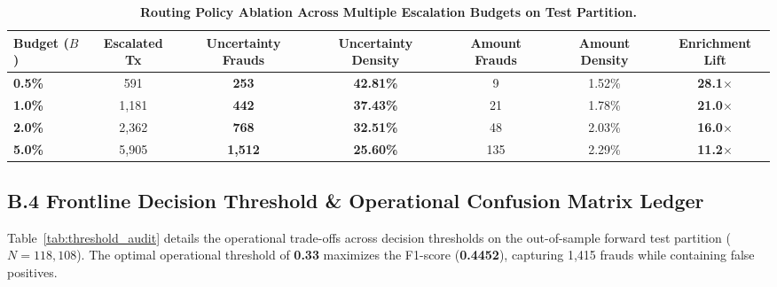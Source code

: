 \documentclass[10pt,a4paper]{article}
\begin{document}
\vspace{-2pt}
\begin{table}[h!]
\centering
\renewcommand{\arraystretch}{0.76}
\caption{\textbf{Routing Policy Ablation Across Multiple Escalation Budgets on Test Partition.}}
\label{tab:ablation}
\vspace{1pt}
\begin{tabularx}{\linewidth}{@{}lcccccc@{}}
\toprule
\textbf{Budget ($B$)} & \textbf{Escalated Tx} & \textbf{Uncertainty Frauds} & \textbf{Uncertainty Density} & \textbf{Amount Frauds} & \textbf{Amount Density} & \textbf{Enrichment Lift} \\
\midrule
\textbf{0.5\%} & 591 & \textbf{253} & \textbf{42.81\%} & 9 & 1.52\% & \textbf{28.1$\times$} \\
\textbf{1.0\%} & 1,181 & \textbf{442} & \textbf{37.43\%} & 21 & 1.78\% & \textbf{21.0$\times$} \\
\textbf{2.0\%} & 2,362 & \textbf{768} & \textbf{32.51\%} & 48 & 2.03\% & \textbf{16.0$\times$} \\
\textbf{5.0\%} & 5,905 & \textbf{1,512} & \textbf{25.60\%} & 135 & 2.29\% & \textbf{11.2$\times$} \\
\bottomrule
\end{tabularx}
\end{table}
\vspace{-5pt}

\subsection*{B.4 Frontline Decision Threshold \& Operational Confusion Matrix Ledger}
Table~\ref{tab:threshold_audit} details the operational trade-offs across decision thresholds on the out-of-sample forward test partition ($N=118,108$). The optimal operational threshold of \textbf{0.33} maximizes the F1-score (\textbf{0.4452}), capturing 1,415 frauds while containing false positives.
\end{document}
